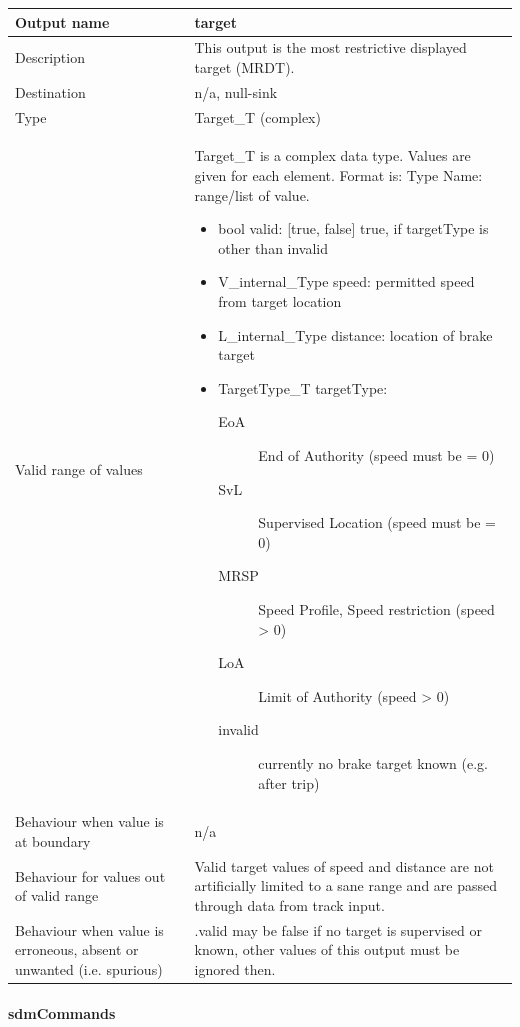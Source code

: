 \begin{longtable}{p{}p{}}
\toprule
Output name				& target \\
\midrule
Description				& This output is the most restrictive displayed target (MRDT). \\
\midrule
Destination				& n/a, null-sink \\ 
\midrule
Type					& Target\_T (complex)\\
\midrule
Valid range of values	& Target\_T is a complex data type. Values are given for each element. Format is: Type Name: range/list of value.
\begin{itemize}
\item bool valid: [true, false] true, if targetType is other than invalid
\item V\_internal\_Type speed: permitted speed from target location
\item L\_internal\_Type distance: location of brake target
\item TargetType\_T targetType:
\begin{description}
\item[EoA] End of Authority (speed must be = 0)
\item[SvL] Supervised Location (speed must be = 0)
\item[MRSP] Speed Profile, Speed restriction (speed > 0)
\item[LoA] Limit of Authority (speed > 0)
\item[invalid] currently no brake target known (e.g. after trip)
\end{description}
\end{itemize}\\
\midrule
Behaviour when value is at boundary	& n/a \\
\midrule
Behaviour for values out of valid range	& Valid target values of speed and distance are not artificially limited to a sane range and are passed through data from track input.\\
\midrule
Behaviour when value is erroneous, absent or unwanted (i.e. spurious) & .valid may be false if no target is supervised or known, other values of this output must be ignored then. \\
\bottomrule
\end{longtable}


\paragraph{sdmCommands}

